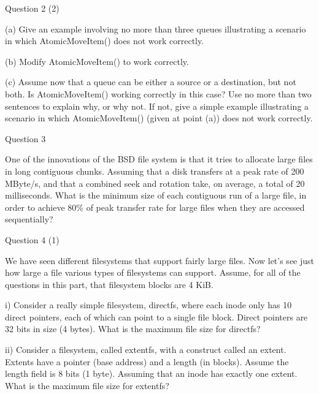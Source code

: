   \begin{frame}{Question 2 (2)}

    (a) Give an example involving no more than three queues illustrating a
    scenario in which AtomicMoveItem() does not work correctly.

    \vspace{1em}

    (b) Modify AtomicMoveItem() to work correctly.

    \vspace{1em}

    (c) Assume now that a queue can be either a source or a destination, but
    not both. Is AtomicMoveItem() working correctly in this case? Use no more
    than two sentences to explain why, or why not. If not, give a simple
    example illustrating a scenario in which AtomicMoveItem() (given at point
    (a)) does not work correctly.
  \end{frame}

  \begin{frame}{Question 3}

    One of the innovations of the BSD file system is that it tries to allocate
    large files in long contiguous chunks. Assuming that a disk transfers at a
    peak rate of 200 MByte/s, and that a combined seek and rotation take, on
    average, a total of 20 milliseconds.
    What is the minimum size of each contiguous run of a large file, in order to
    achieve 80\% of peak transfer rate for large files when they are accessed
    sequentially?
  \end{frame}

  \begin{frame}{Question 4 (1)}

    We have seen different filesystems that support fairly large files. Now
    let’s see just how large a file various types of filesystems can support.
    Assume, for all of the questions in this part, that filesystem blocks are 4
    KiB.

    \vspace{1em}

    i) Consider a really simple filesystem, directfs, where each inode only
has 10 direct pointers, each of which can point to a single file block. Direct
pointers are 32 bits in size (4 bytes). What is the maximum file size for
directfs?

    \vspace{1em}

    ii) Consider a filesystem, called extentfs, with a construct called an
extent. Extents have a pointer (base address) and a length (in blocks). Assume
the length field is 8 bits (1 byte). Assuming that an inode has exactly one
extent. What is the maximum file size for extentfs?
  \end{frame}

